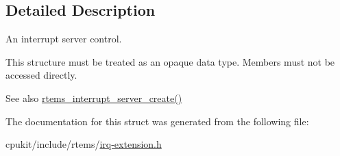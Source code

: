 \subsection{Detailed Description}
An interrupt server control. 

This structure must be treated as an opaque data type. Members must not be accessed directly.

\begin{DoxySeeAlso}{See also}
\mbox{\hyperlink{group__rtems__interrupt__extension_gad7725dd729bfd34f36c0de4d9c326abc}{rtems\+\_\+interrupt\+\_\+server\+\_\+create()}} 
\end{DoxySeeAlso}


The documentation for this struct was generated from the following file\+:\begin{DoxyCompactItemize}
\item 
cpukit/include/rtems/\mbox{\hyperlink{irq-extension_8h}{irq-\/extension.\+h}}\end{DoxyCompactItemize}
